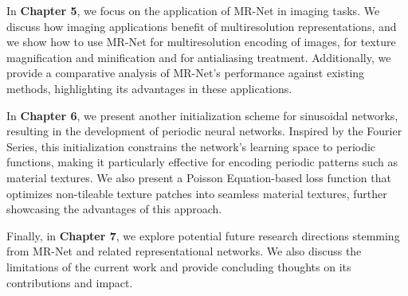 In \textbf{Chapter 5}, we focus on the application of MR-Net in imaging tasks. We discuss how imaging applications benefit of multiresolution representations, and we show how to use MR-Net for multiresolution encoding of images, for texture magnification and minification and for antialiasing treatment. Additionally, we provide a comparative analysis of MR-Net's performance against existing methods, highlighting its advantages in these applications.

In \textbf{Chapter 6}, we present another initialization scheme for sinusoidal networks, resulting in the development of periodic neural networks. Inspired by the Fourier Series, this initialization constrains the network's learning space to periodic functions, making it particularly effective for encoding periodic patterns such as material textures. We also present a Poisson Equation-based loss function that optimizes non-tileable texture patches into seamless material textures, further showcasing the advantages of this approach.


Finally, in \textbf{Chapter 7}, we explore potential future research directions stemming from MR-Net and related representational networks. We also discuss the limitations of the current work and provide concluding thoughts on its contributions and impact.
